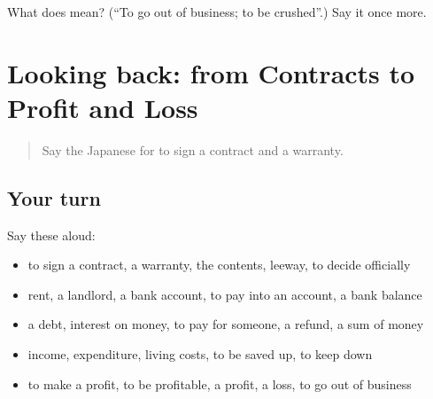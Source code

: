 \begin{tcolorbox}[breakable,colback=teal!4,colframe=teal!35!black,title={Before you move on}]
What does  mean? (\textquotedblleft{}To go out of business; to be crushed\textquotedblright{}.) Say it once more.
\end{tcolorbox}
\section[(dialogue)]{Looking back: from Contracts to Profit and Loss}

\label{lesson:JA-R361-review-357-361}



\begin{quote}
Say the Japanese for to sign a contract and a warranty.
\end{quote}

\subsection*{Your turn}
Say these aloud:

\begin{itemize}
\raggedright
  \item to sign a contract, a warranty, the contents, leeway, to decide officially
  \item rent, a landlord, a bank account, to pay into an account, a bank balance
  \item a debt, interest on money, to pay for someone, a refund, a sum of money
  \item income, expenditure, living costs, to be saved up, to keep down
  \item to make a profit, to be profitable, a profit, a loss, to go out of business
\end{itemize}

